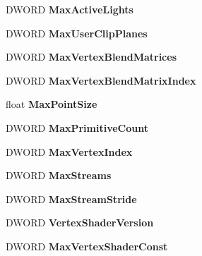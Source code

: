 \begin{DoxyCompactItemize}
D\+W\+O\+RD {\bfseries Max\+Active\+Lights}
\item 
\mbox{\label{struct___w_i_n_e_d3_d_c_a_p_s_aa47431c13186a05555bc77c3f3f5b9d5}} 
D\+W\+O\+RD {\bfseries Max\+User\+Clip\+Planes}
\item 
\mbox{\label{struct___w_i_n_e_d3_d_c_a_p_s_ac715fc7368321d5546a0463a61149cd8}} 
D\+W\+O\+RD {\bfseries Max\+Vertex\+Blend\+Matrices}
\item 
\mbox{\label{struct___w_i_n_e_d3_d_c_a_p_s_a28635894ddfd4dbb793d213b5bf73c1a}} 
D\+W\+O\+RD {\bfseries Max\+Vertex\+Blend\+Matrix\+Index}
\item 
\mbox{\label{struct___w_i_n_e_d3_d_c_a_p_s_aad2327ed4117fb74a166f27354369a8d}} 
float {\bfseries Max\+Point\+Size}
\item 
\mbox{\label{struct___w_i_n_e_d3_d_c_a_p_s_a05a866b66e730adae97f2f22f779dc38}} 
D\+W\+O\+RD {\bfseries Max\+Primitive\+Count}
\item 
\mbox{\label{struct___w_i_n_e_d3_d_c_a_p_s_af9cc65b2a53d237432b8c6bb52fe439b}} 
D\+W\+O\+RD {\bfseries Max\+Vertex\+Index}
\item 
\mbox{\label{struct___w_i_n_e_d3_d_c_a_p_s_ac6a430a91062eb3b37ab0e1bef36f86d}} 
D\+W\+O\+RD {\bfseries Max\+Streams}
\item 
\mbox{\label{struct___w_i_n_e_d3_d_c_a_p_s_a1a4be5af412ff33f4804990fd11fe01d}} 
D\+W\+O\+RD {\bfseries Max\+Stream\+Stride}
\item 
\mbox{\label{struct___w_i_n_e_d3_d_c_a_p_s_adeda9b0e32c3d859e693fa909f690044}} 
D\+W\+O\+RD {\bfseries Vertex\+Shader\+Version}
\item 
\mbox{\label{struct___w_i_n_e_d3_d_c_a_p_s_a058b823cdfaa1c49eb849ea498a17d18}} 
D\+W\+O\+RD {\bfseries Max\+Vertex\+Shader\+Const}
\item 
\mbox{\label{struct___w_i_n_e_d3_d_c_a_p_s_aa2fcf5dd812cd98cbf3039242786fb59}} 

\end{DoxyCompactItemize}
